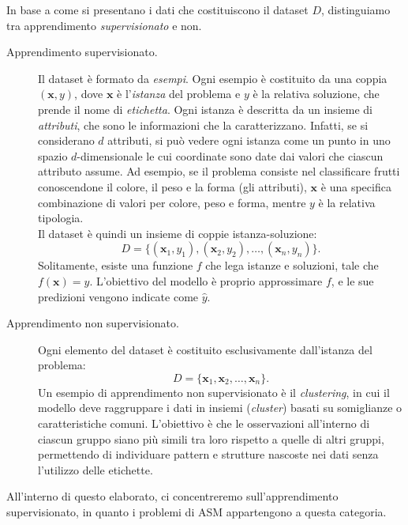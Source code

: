 In base a come si presentano i dati che costituiscono il dataset $D$, distinguiamo tra apprendimento \textit{supervisionato} e non.

\begin{description}
    \item[Apprendimento supervisionato.] Il dataset è formato da \textit{esempi}. Ogni esempio è costituito da una coppia $(\mathbf{x}, y)$, dove $\mathbf{x}$ è l'\textit{istanza} del problema e $y$ è la relativa soluzione, che prende il nome di \textit{etichetta}. Ogni istanza è descritta da un insieme di \textit{attributi}, che sono le informazioni che la caratterizzano. Infatti, se si considerano $d$ attributi, si può vedere ogni istanza come un punto in uno spazio $d$-dimensionale le cui coordinate sono date dai valori che ciascun attributo assume. 
    Ad esempio, se il problema consiste nel classificare frutti conoscendone il colore, il peso e la forma (gli attributi), $\mathbf{x}$ è una specifica combinazione di valori per colore, peso e forma, mentre $y$ è la relativa tipologia. \\ 
    Il dataset è quindi un insieme di coppie istanza-soluzione:
    \begin{equation}
        D=\{(\mathbf{x}_1, y_1), (\mathbf{x}_2, y_2), \dots, (\mathbf{x}_n, y_n)\} .
        \label{expr:dataset-supervisionato}
    \end{equation}  
    Solitamente, esiste una funzione $f$ che lega istanze e soluzioni, tale che $f(\mathbf{x}) = y$. L'obiettivo del modello è proprio approssimare $f$, e le sue predizioni vengono indicate come $\hat{y}$. \\

    \item[Apprendimento non supervisionato.] Ogni elemento del dataset è costituito esclusivamente dall'istanza del problema:
    \begin{equation}
        D = \{\mathbf{x}_1, \mathbf{x}_2, \dots, \mathbf{x}_n \} .
    \end{equation}
    Un esempio di apprendimento non supervisionato è il \textit{clustering}, in cui il modello deve raggruppare i dati in insiemi (\textit{cluster}) basati su somiglianze o caratteristiche comuni. L'obiettivo è che le osservazioni all'interno di ciascun gruppo siano più simili tra loro rispetto a quelle di altri gruppi, permettendo di individuare pattern e strutture nascoste nei dati senza l'utilizzo delle etichette.
\end{description}

All'interno di questo elaborato, ci concentreremo sull'apprendimento supervisionato, in quanto i problemi di ASM appartengono a questa categoria.

